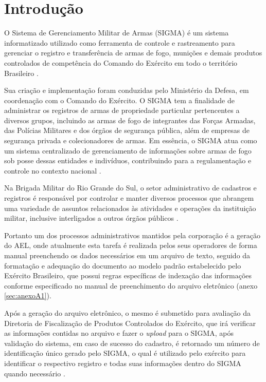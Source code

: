 \chapter{Introdução}

O Sistema de Gerenciamento Militar de Armas (SIGMA) é um sistema informatizado utilizado como ferramenta de controle e rastreamento para gerenciar o registro e transferência de armas de fogo, munições e demais produtos controlados de competência do Comando do Exército em todo o território Brasileiro 
\cite{ExércitoBrasileiro}.

Sua criação e implementação foram conduzidas pelo Ministério da Defesa, em coordenação com o Comando do Exército. O SIGMA tem a finalidade de administrar os registros de armas de propriedade particular pertencentes a diversos grupos, incluindo as armas de fogo de integrantes das Forças Armadas, das Polícias Militares e dos órgãos de segurança pública, além de empresas de segurança privada e colecionadores de armas. Em essência, o SIGMA atua como um sistema centralizado de gerenciamento de informações sobre armas de fogo sob posse dessas entidades e indivíduos, contribuindo para a regulamentação e controle no contexto nacional
\cite{ExércitoBrasileiro}.


Na Brigada Militar do Rio Grande do Sul, o setor administrativo de cadastros e registros é responsável por controlar e manter diversos processos que abrangem uma variedade de assuntos relacionados às atividades e operações da instituição militar, inclusive interligados a outros órgãos públicos
\cite{bmDepartamentoAdministrativo}.

Portanto um dos processos administrativos mantidos pela corporação é a geração do AEL, onde atualmente esta tarefa é realizada pelos seus operadores de forma manual preenchendo os dados necessários em um arquivo de texto, seguido da formatação e adequação do documento ao modelo padrão estabelecido pelo Exército Brasileiro, que possui regras específicas de indexação das informações conforme especificado no manual de preenchimento do arquivo eletrônico (anexo \ref{sec:anexoA1}). 

Após a geração do arquivo eletrônico, o mesmo é submetido para avaliação da Diretoria de Fiscalização de Produtos Controlados do Exército, que irá verificar as informações contidas no arquivo e fazer o \textit{upload} para o SIGMA, após validação do sistema, em caso de sucesso do cadastro, é retornado um número de identificação único gerado pelo SIGMA, o qual é utilizado pelo exército para identificar o respectivo registro e todas suas informações dentro do SIGMA quando necessário \cite{ExércitoBrasileiro}.

